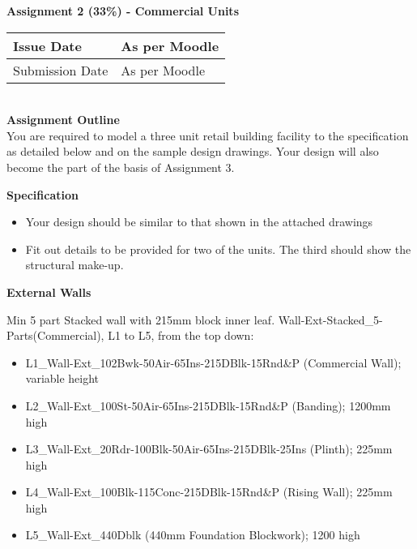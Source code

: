 
	
\begin{flushleft}
\Large\textbf{Assignment 2 (33\%) - Commercial Units}\\
\end{flushleft}

\begin{tabular}{|l|l|}
	\hline 
	Issue Date & As per Moodle \\ 
	\hline 
	Submission Date & As per Moodle \\ 
	\hline 
\end{tabular} 
\\

\large\textbf{Assignment Outline}\\

You are required to model a three unit retail building facility to the specification as detailed below and on the sample design drawings.  Your design will also become the part of the basis of Assignment 3.

\begin{flushleft}
	\large\textbf{Specification}\\
\end{flushleft}

\begin{itemize}
	\item Your design should be similar to that shown in the attached drawings
	\item Fit out details to be provided for two of the units.  The third should show the structural make-up.
\end{itemize}


\begin{flushleft}
	\large\textbf{External Walls}\\
\end{flushleft}
Min 5 part Stacked wall with 215mm block inner leaf.  Wall-Ext-Stacked\_5-Parts(Commercial), L1 to L5, from the top down:
\begin{itemize}
	\item L1\_Wall-Ext\_102Bwk-50Air-65Ins-215DBlk-15Rnd\&P (Commercial Wall); variable height
	\item L2\_Wall-Ext\_100St-50Air-65Ins-215DBlk-15Rnd\&P (Banding); 1200mm high
	\item L3\_Wall-Ext\_20Rdr-100Blk-50Air-65Ins-215DBlk-25Ins (Plinth); 225mm high
	\item L4\_Wall-Ext\_100Blk-115Conc-215DBlk-15Rnd\&P (Rising Wall); 225mm high
	\item L5\_Wall-Ext\_440Dblk (440mm Foundation Blockwork); 1200 high
\end{itemize}




